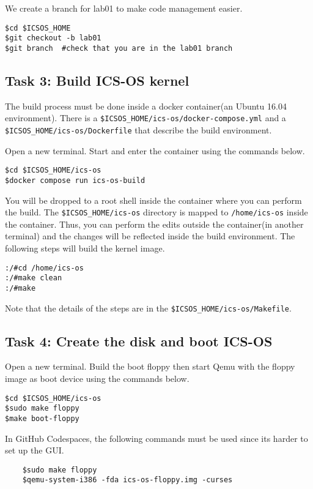 \documentclass[a4paper, 11pt,oneside]{article}
\begin{document}
We create a branch for lab01 to make code management easier.
\begin{verbatim}
$cd $ICSOS_HOME
$git checkout -b lab01
$git branch  #check that you are in the lab01 branch
\end{verbatim}


\subsection*{Task 3: Build ICS-OS kernel}
The build process must be done inside a docker container(an Ubuntu 16.04 environment). There is a 
\texttt{\$ICSOS\_HOME/ics-os/docker-compose.yml} and a 
\texttt{\$ICSOS\_HOME/ics-os/Dockerfile} that describe the build environment.

Open a new terminal. Start and enter the container using the commands below.

\begin{verbatim}
$cd $ICSOS_HOME/ics-os
$docker compose run ics-os-build
\end{verbatim}

You will be dropped to a root shell inside the container where you can perform 
the build. The \texttt{\$ICSOS\_HOME/ics-os} directory is mapped to 
\texttt{/home/ics-os} inside the container. Thus, you can perform the edits 
outside the container(in another terminal) and the changes will be reflected 
inside the build environment. The following steps will build the kernel image. 

\begin{verbatim}
:/#cd /home/ics-os
:/#make clean
:/#make
\end{verbatim}

Note that the details of the steps are in the 
\texttt{\$ICSOS\_HOME/ics-os/Makefile}.

\subsection*{Task 4: Create the disk and boot ICS-OS}
Open a new terminal. Build the boot floppy then start Qemu with the floppy 
image as boot device using the commands below. 

\begin{verbatim}
$cd $ICSOS_HOME/ics-os
$sudo make floppy
$make boot-floppy 
\end{verbatim}

In GitHub Codespaces, the following commands must be used since its harder to set up the GUI.
\begin{verbatim}
	$sudo make floppy
	$qemu-system-i386 -fda ics-os-floppy.img -curses 
\end{verbatim}
\end{document}
